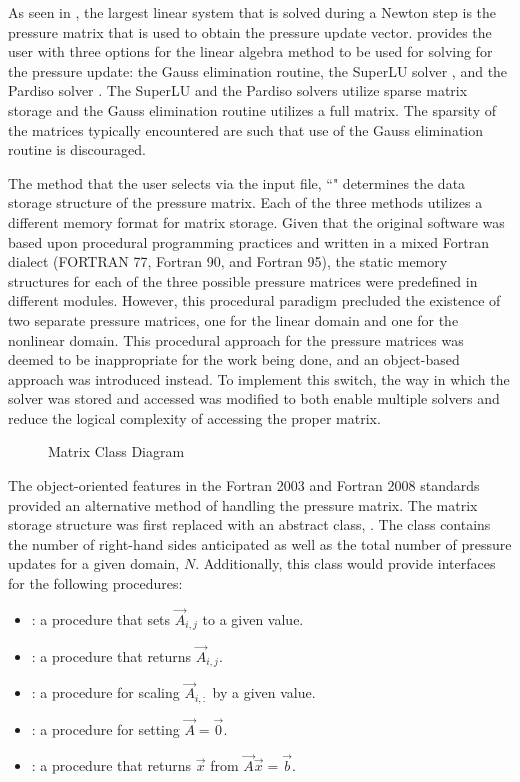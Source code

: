 As seen in , the largest linear system that is solved during a Newton step is the pressure matrix that is used to obtain the pressure update vector.
\cobra{} provides the user with three options for the linear algebra method to be used for solving for the pressure update: the Gauss elimination routine, the SuperLU solver \cite{Li1999}, and the Pardiso solver \cite{Schenk2006, Schenk2007}.
The SuperLU and the Pardiso solvers utilize sparse matrix storage and the Gauss elimination routine utilizes a full matrix.
The sparsity of the matrices typically encountered are such that use of the Gauss elimination routine is discouraged.

The method that the user selects via the \cobra{} input file, ``" determines the data storage structure of the pressure matrix.
Each of the three methods utilizes a different memory format for matrix storage.
Given that the original software was based upon procedural programming practices and written in a mixed Fortran dialect (FORTRAN 77, Fortran 90, and Fortran 95), the static memory structures for each of the three possible pressure matrices were predefined in different modules.
However, this procedural paradigm precluded the existence of two separate pressure matrices, one for the linear domain and one for the nonlinear domain.
This procedural approach for the pressure matrices was deemed to be inappropriate for the work being done, and an object-based approach was introduced instead.
To implement this switch, the way in which the solver was stored and accessed was modified to both enable multiple solvers and reduce the logical complexity of accessing the proper matrix.

\begin{figure}[ht!]
\singlespace\centering

\caption{Matrix Class Diagram}
\label{fig:matrixClassDiagram}
\end{figure}

The object-oriented features in the Fortran 2003 and Fortran 2008 standards provided an alternative method of handling the pressure matrix.
The matrix storage structure was first replaced with an abstract class, .
The  class contains the number of right-hand sides anticipated as well as the total number of pressure updates for a given domain, $N$.
Additionally, this class would provide interfaces for the following procedures:

\begin{itemize}
\item{ : a procedure that sets $\vec{A}_{i,j}$ to a given value.}
\item{ : a procedure that returns $\vec{A}_{i,j}$.}
\item{ : a procedure for scaling $\vec{A}_{i, :}$ by a given value.}
\item{ : a procedure for setting $\vec{A} = \vec{0}$.}
\item{ : a procedure that returns $\vec{x}$ from $\vec{A}\vec{x} = \vec{b}$.}
\end{itemize}

